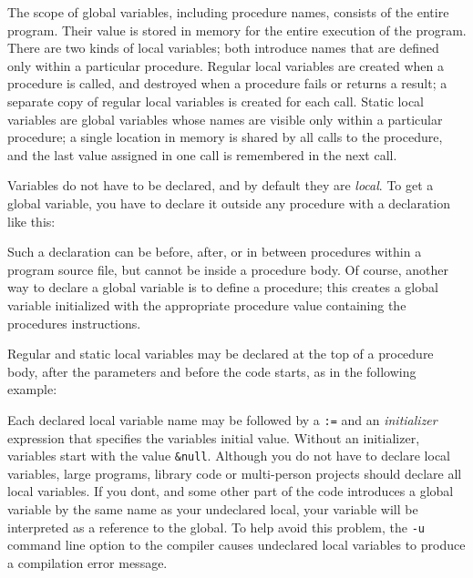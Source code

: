 The scope of global variables, including
procedure names, consists of the entire program. Their value is stored
in memory for the entire execution of the program. There are two kinds
of local variables; both introduce names that
are defined only within a particular procedure. Regular local variables
are created when a procedure is called, and destroyed when a procedure
fails or returns a result; a separate copy of regular local variables
is created for each call. Static local
variables are global variables whose names are visible only within a
particular procedure; a single location in memory is shared by all
calls to the procedure, and the last value assigned in one call is
remembered in the next call.

Variables do not have to be declared, and by default they are
\textit{local}. To get a global variable, you have to declare it
outside any procedure with a declaration like this:


Such a declaration can be before, after, or in between procedures within
a program source file, but cannot be inside a procedure body. Of
course, another way to declare a global variable is to define a
procedure; this creates a global variable initialized with the
appropriate procedure value containing the procedure{\textquotesingle}s
instructions.

Regular and static local variables may be declared at the top of a
procedure body, after the parameters and before the code starts, as in
the following example:


Each declared local variable name may be followed by a \texttt{:=} and
an \textit{initializer} expression that specifies the
variable{\textquotesingle}s initial value. Without an initializer,
variables start with the value \texttt{\&null}. Although
you do not have to declare local variables, large programs,
library code or multi-person projects should declare
all local variables. If you don{\textquotesingle}t, and some other part
of the code introduces a global variable by the same name as your
undeclared local, your variable will be interpreted as a
reference to the global. To help avoid this
problem, the \texttt{{}-u} command line option to the
compiler causes undeclared
local variables to produce a compilation error message.


